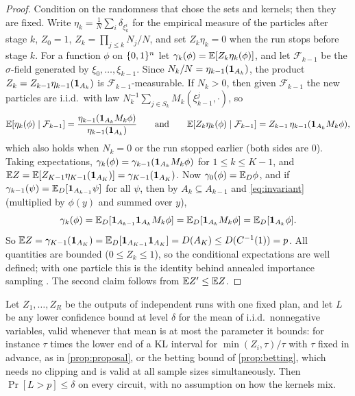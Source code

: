 \begin{proof}
Condition on the randomness that chose the sets and kernels; then they are fixed. Write
$\eta_k=\frac1N\sum_i\delta_{\xi_k^i}$ for the empirical measure of the particles after
stage $k$, $Z_0=1$, $Z_k=\prod_{j\le k}N_j/N$, and set $Z_k\eta_k=0$ when the run stops
before stage $k$. For a function $\phi$ on $\{0,1\}^n$ let
$\gamma_k(\phi)=\mathbb{E}[Z_k\eta_k(\phi)]$, and let $\mathcal F_{k-1}$ be the $\sigma$-field
generated by $\xi_0,\dots,\xi_{k-1}$. Since $N_k/N=\eta_{k-1}(\mathbf{1}_{A_k})$, the product
$Z_k=Z_{k-1}\eta_{k-1}(\mathbf{1}_{A_k})$ is $\mathcal F_{k-1}$-measurable. If $N_k>0$, then
given $\mathcal F_{k-1}$ the new particles are i.i.d.\ with law
$N_k^{-1}\sum_{j\in S_k}M_k(\xi_{k-1}^j,\cdot)$, so
\[
\mathbb{E}[\eta_k(\phi)\mid\mathcal F_{k-1}]=\frac{\eta_{k-1}(\mathbf{1}_{A_k}M_k\phi)}{\eta_{k-1}(\mathbf{1}_{A_k})}
\qquad\text{and}\qquad
\mathbb{E}[Z_k\eta_k(\phi)\mid\mathcal F_{k-1}]=Z_{k-1}\,\eta_{k-1}(\mathbf{1}_{A_k}M_k\phi),
\]
which also holds when $N_k=0$ or the run stopped earlier (both sides are $0$). Taking
expectations, $\gamma_k(\phi)=\gamma_{k-1}(\mathbf{1}_{A_k}M_k\phi)$ for $1\le k\le K-1$, and
$\mathbb{E} Z=\mathbb{E}[Z_{K-1}\eta_{K-1}(\mathbf{1}_{A_K})]=\gamma_{K-1}(\mathbf{1}_{A_K})$. Now
$\gamma_0(\phi)=\mathbb{E}_D\phi$, and if $\gamma_{k-1}(\psi)=\mathbb{E}_D[\mathbf{1}_{A_{k-1}}\psi]$ for all
$\psi$, then by $A_k\subseteq A_{k-1}$ and \eqref{eq:invariant} (multiplied by $\phi(y)$
and summed over $y$),
\[
\gamma_k(\phi)=\mathbb{E}_D[\mathbf{1}_{A_{k-1}}\mathbf{1}_{A_k}M_k\phi]=\mathbb{E}_D[\mathbf{1}_{A_k}M_k\phi]=\mathbb{E}_D[\mathbf{1}_{A_k}\phi].
\]
So $\mathbb{E} Z=\gamma_{K-1}(\mathbf{1}_{A_K})=\mathbb{E}_D[\mathbf{1}_{A_{K-1}}\mathbf{1}_{A_K}]=D(A_K)\le D(C^{-1}(1))=p$.
All quantities are bounded ($0\le Z_k\le1$), so the conditional expectations are
well defined; with one particle this is the identity behind annealed importance
sampling \cite{neal2001}. The second claim follows from $\mathbb{E} Z'\le\mathbb{E} Z$.
\end{proof}

\begin{corollary}\label{cor:splitting}
Let $Z_1,\dots,Z_R$ be the outputs of independent runs with one fixed plan, and let
$L$ be any lower confidence bound at level $\delta$ for the mean of i.i.d.\
nonnegative variables, valid whenever that mean is at most the parameter it bounds:
for instance $\tau$ times the lower end of a KL interval for $\min(Z_i,\tau)/\tau$ with
$\tau$ fixed in advance, as in \cref{prop:proposal}, or the betting bound of
\cref{prop:betting}, which needs no clipping and is valid at all sample sizes
simultaneously. Then $\Pr[L>p]\le\delta$ on every circuit, with no assumption on how
the kernels mix.
\end{corollary}

